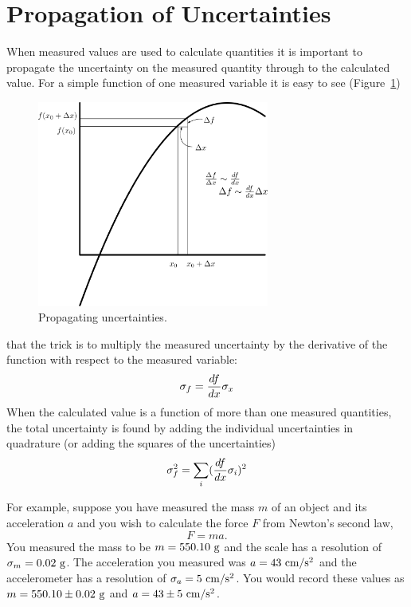 \section{Propagation of Uncertainties}

When measured values are used to calculate quantities it is important to
propagate the uncertainty on the measured quantity through to the calculated
value.  For a simple function of one measured variable it is easy to see
(Figure~\ref{fig:error-prop})
\begin{figure}
\includegraphics[width=3in]{../images/error-prop.png}
\caption{Propagating uncertainties.}
\label{fig:error-prop}
\end{figure}
that the trick is to multiply the measured uncertainty by the derivative of the
function with respect to the measured variable: 
\begin{equation}
\sigma_f = {df \over dx} \sigma_x
\end{equation}
\noindent When the calculated value is a function of more than one measured
quantities, the total uncertainty is found by adding the individual
uncertainties in quadrature (or adding the squares of the uncertainties)
\begin{equation}
\sigma_f^2 = \sum_i ({df \over dx} \sigma_i)^2
\label{eq:error-prop}
\end{equation}

For example, suppose you have measured the mass $m$ of an object and its
acceleration $a$ and you wish to calculate the force $F$ from Newton's second
law,
\begin{equation}
F = ma.
\label{eq:newton}
\end{equation}
You measured the mass to be $m = 550.10~ {\rm g}$ and the scale has a resolution of $\sigma_m = 0.02 ~{\rm g}$.  The acceleration you measured was $a = 43 ~{\rm cm}/{\rm s}^2$ and the accelerometer has a resolution of $\sigma_a = 5 ~{\rm cm}/{\rm s}^2$.  You would record these values as $m = 550.10 \pm 0.02 ~{\rm g}$ and $a = 43 \pm 5 ~{\rm cm}/{\rm s}^2$.

